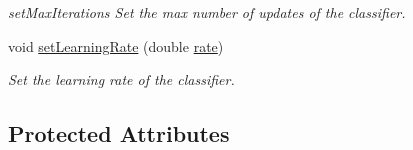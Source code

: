 \begin{DoxyCompactItemize}
\begin{DoxyCompactList}\small\item\em set\+Max\+Iterations Set the max number of updates of the classifier. \end{DoxyCompactList}\item 
void \hyperlink{class_classifier_a8f6818bd403afbb46d1bfd75c9731ab6}{set\+Learning\+Rate} (double \hyperlink{class_classifier_af9867e5919742de1303dd971a9a1c19a}{rate})
\begin{DoxyCompactList}\small\item\em Set the learning rate of the classifier. \end{DoxyCompactList}\end{DoxyCompactItemize}
\subsection*{Protected Attributes}
